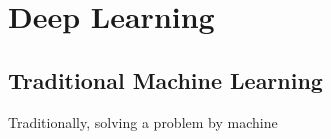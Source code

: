 \chapter{Deep Learning}
    \begin{marginfigure}%
    \end{marginfigure}%
\section{Traditional Machine Learning}
    Traditionally, solving a problem by machine 


